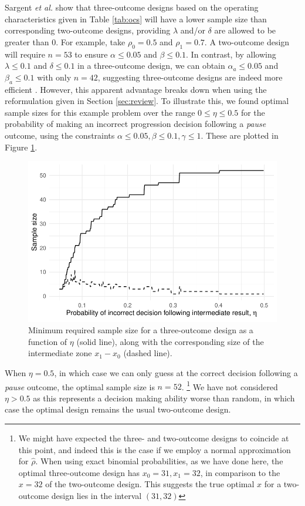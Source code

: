 \documentclass{bmcart}
\begin{document}
Sargent \emph{et al.} show that three-outcome designs based on the operating characteristics given in Table \ref{tab:ocs} will have a lower sample size than corresponding two-outcome designs, providing $\lambda$ and/or $\delta$ are allowed to be greater than 0. For example, take $\rho_0 = 0.5$ and $\rho_1 = 0.7$. A two-outcome design will require $n = 53$ to ensure $\alpha \leq 0.05$ and $\beta \leq 0.1$. In contrast, by allowing $\lambda \leq 0.1$ and $\delta \leq 0.1$ in a three-outcome design, we can obtain $\alpha_a \leq 0.05$ and $\beta_a \leq 0.1$ with only $n = 42$, suggesting three-outcome designs are indeed more efficient \cite{Sargent2001, Hong2007}. However, this apparent advantage breaks down when using the reformulation given in Section \ref{sec:review}. To illustrate this, we found optimal sample sizes for this example problem over the range $0 \leq \eta \leq 0.5$ for the probability of making an incorrect progression decision following a \emph{pause} outcome, using the constraints $\alpha \leq 0.05, \beta \leq 0.1, \gamma \leq 1$. These are plotted in Figure \ref{fig:eta_ns}.

\begin{figure}
\centering
\includegraphics[scale=0.8]{./figures/eta_ns}
\caption{Minimum required sample size for a three-outcome design as a function of $\eta$ (solid line), along with the corresponding size of the intermediate zone $x_1 - x_0$ (dashed line).}
\label{fig:eta_ns}
\end{figure}

When $\eta = 0.5$, in which case we can only guess at the correct decision following a \emph{pause} outcome, the optimal sample size is $n = 52$. \footnote{We might have expected the three- and two-outcome designs to coincide at this point, and indeed this is the case if we employ a normal approximation for $\hat{\rho}$. When using exact binomial probabilities, as we have done here, the optimal three-outcome design has $x_0 = 31, x_1 = 32$, in comparison to the $x = 32$ of the two-outcome design. This suggests the true optimal $x$ for a two-outcome design lies in the interval $(31, 32)$} We have not considered $\eta > 0.5$ as this represents a decision making ability worse than random, in which case the optimal design remains the usual two-outcome design.
\end{document}
